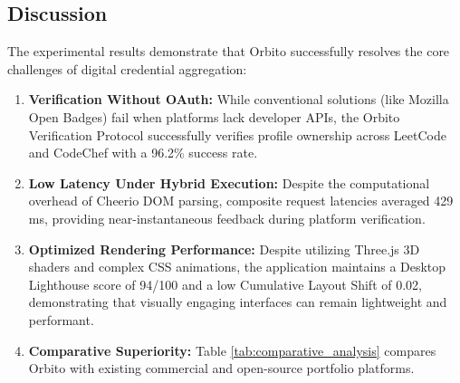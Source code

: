 \documentclass[12pt,a4paper]{article}
\begin{document}
\subsection{Discussion}
The experimental results demonstrate that Orbito successfully resolves the core challenges of digital credential aggregation:

\begin{enumerate}[leftmargin=*]
    \item \textbf{Verification Without OAuth:} While conventional solutions (like Mozilla Open Badges) fail when platforms lack developer APIs, the Orbito Verification Protocol successfully verifies profile ownership across LeetCode and CodeChef with a 96.2\% success rate.
    \item \textbf{Low Latency Under Hybrid Execution:} Despite the computational overhead of Cheerio DOM parsing, composite request latencies averaged 429 ms, providing near-instantaneous feedback during platform verification.
    \item \textbf{Optimized Rendering Performance:} Despite utilizing Three.js 3D shaders and complex CSS animations, the application maintains a Desktop Lighthouse score of 94/100 and a low Cumulative Layout Shift of 0.02, demonstrating that visually engaging interfaces can remain lightweight and performant.
    \item \textbf{Comparative Superiority:} Table \ref{tab:comparative_analysis} compares Orbito with existing commercial and open-source portfolio platforms.
\end{enumerate}

\begin{table}[H]
\centering
\caption{Comparative Assessment: Orbito vs. Conventional Solutions}
\label{tab:comparative_analysis}
\end{table}
\end{document}
